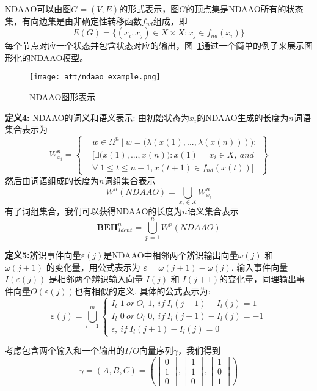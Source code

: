 NDAAO可以由图$G=(V,E)$的形式表示，图$G$的顶点集是NDAAO所有的状态集，有向边集是由非确定性转移函数$f_{nd}$组成，即\[ E(G)=\big\{(x_i,x_j)\in X\times X: x_j\in f_{nd}(x_i)\big\} \]每个节点对应一个状态并包含状态对应的输出，图~\ref{fig4}通过一个简单的例子来展示图形化的NDAAO模型。

\begin{figure}[!htb]
  \centering
  \texttt{[image: att/ndaao\_example.png]}
  \caption{NDAAO图形表示}
  \label{fig4}
\end{figure}

\textbf{定义4:} NDAAO的词义和语义表示: 由初始状态为$x_i$的NDAAO生成的长度为$n$词语集合表示为
\begin{equation} 
W_{x_i}^{n}=\left\{\begin{split} &w\in \Omega^n~|~ w=\big( \lambda(x(1),...,\lambda(x(n))) \big):\\ 
&[\exists \big(x(1),...,x(n)\big): x(1)=x_i\in X,~and\\
&\forall\;1\leq t\leq n-1, x(t+1)\in f_{nd}(x(t))] \end{split} \right\} 
\end{equation} 然后由词语组成的长度为$n$词组集合表示
\begin{equation} 
W^n(NDAAO)=\bigcup_{x_i\in X} W_{x_i}^{n} 
\end{equation} 有了词组集合，我们可以获得NDAAO的长度为$n$语义集合表示
\begin{equation} 
\textbf{BEH}_{Ident}^n=\bigcup_{p=1}^n W^{p}(NDAAO) 
\end{equation}

\textbf{定义5:}辨识事件向量$\varepsilon(j)$是NDAAO中相邻两个辨识输出向量$\omega(j)$ 和 $\omega(j+1)$ 的变化量，用公式表示为 $\varepsilon=\omega(j+1)-\omega(j)$. 输入事件向量 $I(\varepsilon(j))$ 是相邻两个辨识输入向量 $I(j)$ 和 $I(j+1)$的变化量，同理输出事件向量$O(\varepsilon(j))$也有相似的定义. 具体的公式表示为:
\begin{equation} 
\varepsilon(j)=\bigcup_{l=1}^m \begin{cases}
I_l\_1~or~O_l\_1,~if~ I_l(j+1)-I_l(j)=1\\
I_l\_0~or~O_l\_0,~if~ I_l(j+1)-I_l(j)=-1\\
\epsilon,~if~ I_l(j+1)-I_l(j)=0
\end{cases} 
\end{equation}

考虑包含两个输入和一个输出的$I/O$向量序列$\gamma$，我们得到 \[\gamma=(A,B,C)=( \begin{bmatrix}
0\\1\\0
\end{bmatrix},\begin{bmatrix}
1\\1\\0
\end{bmatrix},\begin{bmatrix}
1\\0\\1
\end{bmatrix})\]

